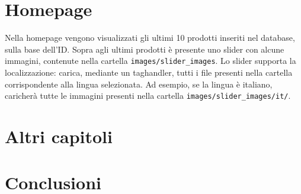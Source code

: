 \chapter{Homepage}
Nella homepage vengono visualizzati gli ultimi 10 prodotti inseriti nel database, sulla base dell'ID. Sopra agli ultimi prodotti è presente uno slider con alcune immagini, contenute nella cartella \texttt{images/slider\_images}. Lo slider supporta la localizzazione: carica, mediante un taghandler, tutti i file presenti nella cartella corrispondente alla lingua selezionata. Ad esempio, se la lingua è italiano, caricherà tutte le immagini presenti nella cartella \texttt{images/slider\_images/it/}.




\chapter{Altri capitoli}
\chapter{Conclusioni}

